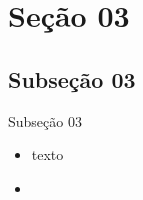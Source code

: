 

\section{Seção 03}

\subsection[]{Subseção 03}

\begin{frame}{Subseção 03}
	\begin{itemize}[<+->]
		\item texto
		\item 
	\end{itemize}
\end{frame}



